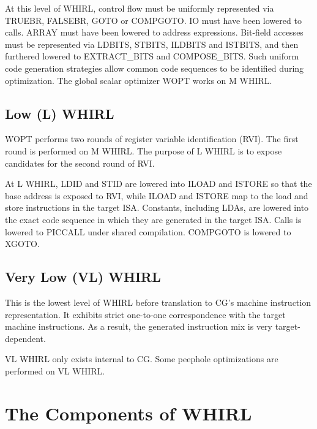 At this level of WHIRL, control flow must be uniformly represented
via
%
TRUEBR, 
%
FALSEBR,
%
GOTO or
%
COMPGOTO.
%
IO must have been lowered
to calls.
%
ARRAY must have been lowered to address expressions. Bit-field accesses
must be represented via
%
LDBITS,
%
STBITS,
%
ILDBITS and
%
ISTBITS, and then furthered lowered to
%
EXTRACT\_BITS and 
%
COMPOSE\_BITS. Such uniform code generation strategies
allow common code sequences to be
identified during optimization. The global scalar optimizer WOPT
works on M WHIRL.

\subsection{Low (L) WHIRL}

WOPT performs two rounds of register variable identification (RVI).
The first round is performed on M WHIRL. The purpose of L WHIRL is
to expose candidates for the second round of RVI. 

At L WHIRL,
%
LDID
and
%
STID are lowered into
%
ILOAD and
%
ISTORE so that the base address
is exposed to RVI, while
%
ILOAD and
%
ISTORE map to the load and store instructions in the target
ISA. Constants, including
%
LDAs, are lowered into the exact code sequence in which they are
generated in
the target ISA. Calls is lowered to
%
PICCALL under shared compilation.
%
COMPGOTO is lowered to
%
XGOTO.

\subsection{Very Low (VL) WHIRL}

This is the lowest level of WHIRL before translation to CG's machine
instruction representation. It exhibits strict one-to-one
correspondence with the target machine instructions. As a result, the generated
instruction mix is very target-dependent.

VL WHIRL only exists internal to CG. Some peephole optimizations
are performed on VL WHIRL.

\section{The Components of WHIRL}

